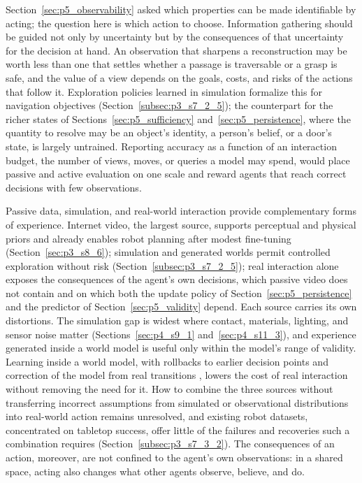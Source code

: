 Section~\ref{sec:p5_observability} asked which properties can be made identifiable by acting; the question here is which action to choose.
Information gathering should be guided not only by uncertainty but by the consequences of that uncertainty for the decision at hand.
An observation that sharpens a reconstruction may be worth less than one that settles whether a passage is traversable or a grasp is safe, and the value of a view depends on the goals, costs, and risks of the actions that follow it.
Exploration policies learned in simulation formalize this for navigation objectives (Section~\ref{subsec:p3_s7_2_5}); the counterpart for the richer states of Sections~\ref{sec:p5_sufficiency} and~\ref{sec:p5_persistence}, where the quantity to resolve may be an object's identity, a person's belief, or a door's state, is largely untrained.
Reporting accuracy as a function of an interaction budget, the number of views, moves, or queries a model may spend, would place passive and active evaluation on one scale and reward agents that reach correct decisions with few observations.

Passive data, simulation, and real-world interaction provide complementary forms of experience.
Internet video, the largest source, supports perceptual and physical priors and already enables robot planning after modest fine-tuning (Section~\ref{sec:p3_s8_6}); simulation and generated worlds permit controlled exploration without risk (Section~\ref{subsec:p3_s7_2_5}); real interaction alone exposes the consequences of the agent's own decisions, which passive video does not contain and on which both the update policy of Section~\ref{sec:p5_persistence} and the predictor of Section~\ref{sec:p5_validity} depend.
Each source carries its own distortions.
The simulation gap is widest where contact, materials, lighting, and sensor noise matter (Sections~\ref{sec:p4_s9_1} and~\ref{sec:p4_s11_3}), and experience generated inside a world model is useful only within the model's range of validity.
Learning inside a world model, with rollbacks to earlier decision points and correction of the model from real transitions \cite{luo2026rollback}, lowers the cost of real interaction without removing the need for it.
How to combine the three sources without transferring incorrect assumptions from simulated or observational distributions into real-world action remains unresolved, and existing robot datasets, concentrated on tabletop success, offer little of the failures and recoveries such a combination requires (Section~\ref{subsec:p3_s7_3_2}).
The consequences of an action, moreover, are not confined to the agent's own observations: in a shared space, acting also changes what other agents observe, believe, and do.


